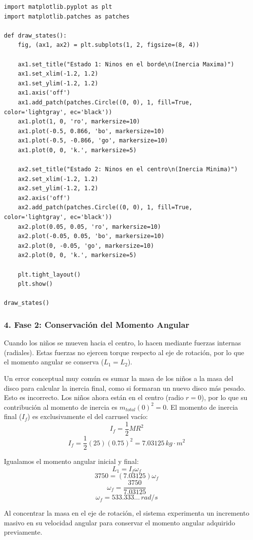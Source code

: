 \documentclass[12pt, a4paper]{article}
\begin{document}
\begin{lstlisting}
import matplotlib.pyplot as plt
import matplotlib.patches as patches

def draw_states():
    fig, (ax1, ax2) = plt.subplots(1, 2, figsize=(8, 4))
    
    ax1.set_title("Estado 1: Ninos en el borde\n(Inercia Maxima)")
    ax1.set_xlim(-1.2, 1.2)
    ax1.set_ylim(-1.2, 1.2)
    ax1.axis('off')
    ax1.add_patch(patches.Circle((0, 0), 1, fill=True, color='lightgray', ec='black'))
    ax1.plot(1, 0, 'ro', markersize=10)
    ax1.plot(-0.5, 0.866, 'bo', markersize=10)
    ax1.plot(-0.5, -0.866, 'go', markersize=10)
    ax1.plot(0, 0, 'k.', markersize=5)
    
    ax2.set_title("Estado 2: Ninos en el centro\n(Inercia Minima)")
    ax2.set_xlim(-1.2, 1.2)
    ax2.set_ylim(-1.2, 1.2)
    ax2.axis('off')
    ax2.add_patch(patches.Circle((0, 0), 1, fill=True, color='lightgray', ec='black'))
    ax2.plot(0.05, 0.05, 'ro', markersize=10)
    ax2.plot(-0.05, 0.05, 'bo', markersize=10)
    ax2.plot(0, -0.05, 'go', markersize=10)
    ax2.plot(0, 0, 'k.', markersize=5)
    
    plt.tight_layout()
    plt.show()

draw_states()
\end{lstlisting}

\subsubsection*{4. Fase 2: Conservación del Momento Angular}
Cuando los niños se mueven hacia el centro, lo hacen mediante fuerzas internas (radiales). Estas fuerzas no ejercen torque respecto al eje de rotación, por lo que el momento angular se conserva ($L_1 = L_2$).

Un error conceptual muy común es sumar la masa de los niños a la masa del disco para calcular la inercia final, como si formaran un nuevo disco más pesado. Esto es incorrecto. Los niños ahora están en el centro (radio $r = 0$), por lo que su contribución al momento de inercia es $m_{total}(0)^2 = 0$. 
El momento de inercia final ($I_f$) es exclusivamente el del carrusel vacío:
$$I_f = \frac{1}{2} M R^2$$
$$I_f = \frac{1}{2}(25)(0.75)^2 = 7.03125 \, \si{kg\cdot m^2}$$

Igualamos el momento angular inicial y final:
$$L_1 = I_f \omega_f$$
$$3750 = (7.03125) \omega_f$$
$$\omega_f = \frac{3750}{7.03125}$$
$$\omega_f = 533.333... \, \si{rad/s}$$

Al concentrar la masa en el eje de rotación, el sistema experimenta un incremento masivo en su velocidad angular para conservar el momento angular adquirido previamente.
\end{document}
